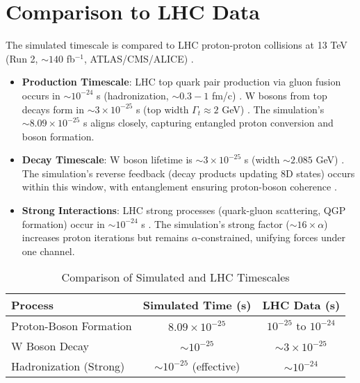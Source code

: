 \documentclass[12pt]{article}
\theoremstyle{definition}
\begin{document}
\section{Comparison to LHC Data}
The simulated timescale is compared to LHC proton-proton collisions at 13 TeV (Run 2, $\sim 140$ fb$^{-1}$, ATLAS/CMS/ALICE) \citep{aad2015atlas, cms2018wboson, alice2017femtoscopy}.

\begin{itemize}
    \item \textbf{Production Timescale}: LHC top quark pair production via gluon fusion occurs in $\sim 10^{-24}$ s (hadronization, $\sim 0.3-1$ fm/c) \citep{alice2017femtoscopy}. W bosons from top decays form in $\sim 3 \times 10^{-25}$ s (top width $\Gamma_t \approx 2$ GeV) \citep{aad2015atlas}. The simulation’s $\sim 8.09 \times 10^{-25}$ s aligns closely, capturing entangled proton conversion and boson formation.
    \item \textbf{Decay Timescale}: W boson lifetime is $\sim 3 \times 10^{-25}$ s (width $\sim 2.085$ GeV) \citep{cms2018wboson}. The simulation’s reverse feedback (decay products updating 8D states) occurs within this window, with entanglement ensuring proton-boson coherence \citep{atlas2022ttbar}.
    \item \textbf{Strong Interactions}: LHC strong processes (quark-gluon scattering, QGP formation) occur in $\sim 10^{-24}$ s \citep{alice2017femtoscopy}. The simulation’s strong factor ($\sim 16 \times \alpha$) increases proton iterations but remains $\alpha$-constrained, unifying forces under one channel.
\end{itemize}

\begin{table}[h]
    \centering
    \caption{Comparison of Simulated and LHC Timescales}
    \begin{tabular}{lcc}
        \toprule
        \textbf{Process} & \textbf{Simulated Time (s)} & \textbf{LHC Data (s)} \\
        \midrule
        Proton-Boson Formation & $8.09 \times 10^{-25}$ & $10^{-25}$ to $10^{-24}$ \\
        W Boson Decay & $\sim 10^{-25}$ & $\sim 3 \times 10^{-25}$ \\
        Hadronization (Strong) & $\sim 10^{-25}$ (effective) & $\sim 10^{-24}$ \\
        \bottomrule
    \end{tabular}
    \label{tab:lhctimes}
\end{table}
\end{document}
